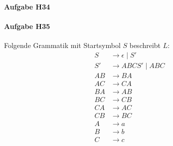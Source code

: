 \documentclass[11pt]{article}
\begin{document}
\paragraph{Aufgabe H34}


\paragraph{Aufgabe H35} Folgende Grammatik mit Startsymbol $S$ beschreibt $L$:
\begin{align*}
S &\rightarrow \epsilon \mid S'	\\
S' &\rightarrow ABCS' \mid ABC	    \\
AB &\rightarrow BA					\\
AC &\rightarrow CA					\\
BA &\rightarrow AB					\\
BC &\rightarrow CB					\\
CA &\rightarrow AC					\\
CB &\rightarrow BC					\\
A &\rightarrow a					\\
B &\rightarrow b					\\
C &\rightarrow c					\\
\end{align*}
\end{document}
